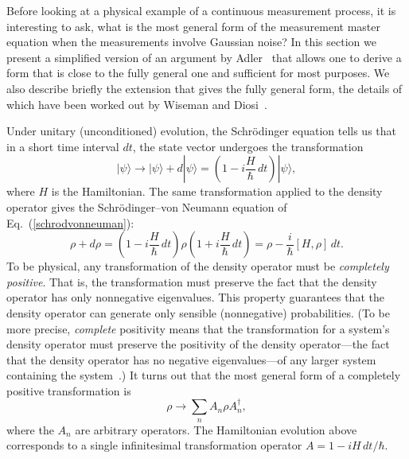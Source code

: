 \documentclass[12pt,aps,onecolum,superscriptaddress,footinbib,floatfix,showpacs]{revtex4-1}
\def\ket#1{|{#1}\rangle}
\begin{document}
Before looking at a physical example of a continuous measurement process,
it is interesting to ask, what is the most general form of the measurement 
master equation when the measurements involve Gaussian noise?  
In this section we present a simplified version of an
argument by Adler~\cite{Adler00} that allows one to derive a form 
that is close to the fully general one and sufficient for most purposes. We 
also describe briefly the extension that gives the fully general form, the details 
of which have been worked out by Wiseman and Diosi~\cite{Wiseman01}. 

Under unitary (unconditioned) evolution, the Schr\"odinger equation
tells us that in a short time interval $dt$, the state vector
undergoes the transformation 
\begin{equation}
  \ket\psi \longrightarrow \ket\psi + d\ket\psi =
    \left(1-i\frac{H}{\hbar}\,dt\right)\ket\psi,
\end{equation}
where $H$ is the Hamiltonian.
The same transformation applied to the density operator gives the
Schr\"odinger--von Neumann equation of Eq.~(\ref{schrodvonneuman}):
\begin{equation}
    \rho + d\rho = 
    \left(1-i\frac{H}{\hbar}\,dt\right)\rho \left(1+i\frac{H}{\hbar}\,dt\right)
    = \rho-\frac{i}{\hbar}[H,\rho]\,dt.
\end{equation}
To be physical, any transformation of the density operator must be
\textit{completely positive}. That is, the transformation must preserve the
fact that the density operator has only nonnegative eigenvalues.
This property guarantees that the density operator can generate only sensible 
(nonnegative)
probabilities. (To be more precise, \textit{complete} positivity means that 
the transformation for a system's density operator 
must preserve the positivity of the density operator---the fact that
the density operator has no negative eigenvalues---of any larger system 
containing
the system~\cite{mikeandike}.)
It turns out that the most general form of a completely positive
transformation is
\begin{equation}
  \rho\longrightarrow \sum_n A_n\rho A_n^\dagger,
  \label{rhotransform}
\end{equation}
where the $A_n$ are arbitrary operators.
The Hamiltonian evolution above corresponds to a single infinitesimal
transformation
operator $A=1-iH\,dt/\hbar$.
\end{document}

